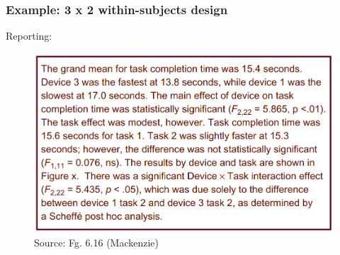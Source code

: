 \documentclass{beamer}
\begin{document}
\begin{frame}
	\frametitle{Example: 3 x 2 within-subjects design} 
	Reporting:
	\begin{figure}
		\includegraphics[width=0.7\linewidth]{2way-report}
		\caption{Source: Fg. 6.16 (Mackenzie)}
	\end{figure}
\end{frame}

%

\end{document}
